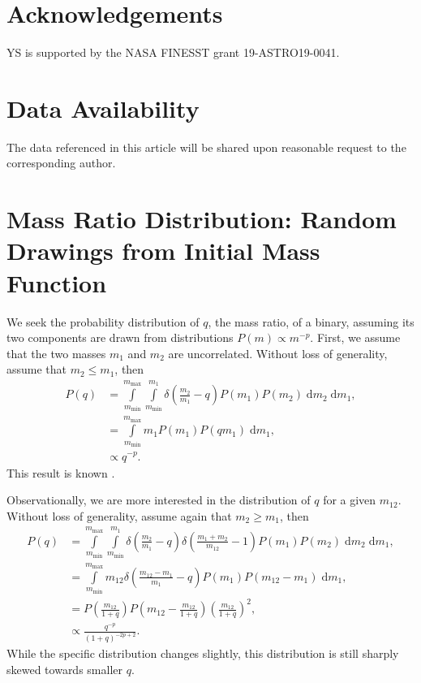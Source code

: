 \documentclass[
        fleqn,
        usenatbib,
    ]{mnras}
\newcommand*{\p}[1]{\left(#1\right)}
\begin{document}
\section{Acknowledgements}\label{s:ack}

YS is supported by the NASA FINESST grant 19-ASTRO19-0041.%

\section{Data Availability}

The data referenced in this article will be shared upon reasonable request to
the corresponding author.




\clearpage
\onecolumn

\appendix

\section{Mass Ratio Distribution: Random Drawings from Initial Mass
Function}\label{s:ratios}

We seek the probability distribution of $q$, the mass ratio, of a binary,
assuming its two components are drawn from distributions $P(m) \propto m^{-p}$.
First, we assume that the two masses $m_1$ and $m_2$ are uncorrelated. Without
loss of generality, assume that $m_2 \leq m_1$, then
\begin{align}
    P(q) &= \int\limits_{m_{\min}}^{m_{\max}}\int\limits_{m_{\min}}^{m_1}
            \delta\p{\frac{m_2}{m_1} - q}P(m_1) P(m_2)
            \;\mathrm{d}m_2\;\mathrm{d}m_1,\\
        &= \int\limits_{m_{\min}}^{m_{\max}} m_1 P(m_1) P(qm_1)
            \;\mathrm{d}m_1,\\
        &\propto q^{-p}.
\end{align}
This result is known \citep[e.g.][]{moe2017mind}.

Observationally, we are more interested in the distribution of $q$ for a given
$m_{12}$. Without loss of generality, assume again that $m_2 \geq m_1$, then
\begin{align}
    P(q) &= \int\limits_{m_{\min}}^{m_{\max}}
            \int\limits_{m_{\min}}^{m_1}
            \delta\p{\frac{m_2}{m_1} - q}
            \delta\p{\frac{m_1 + m_2}{m_{12}} - 1}
            P(m_1)
            P\p{m_2}\;\mathrm{d}m_2\;\mathrm{d}m_1,\\
        &= \int\limits_{m_{\min}}^{m_{\max}}
            m_{12}\delta\p{\frac{m_{12} - m_1}{m_1} - q}
            P(m_1)
            P\p{m_{12} - m_1}\;\mathrm{d}m_1,\\
        &= P\p{\frac{m_{12}}{1 + q}}P\p{m_{12} - \frac{m_{12}}{1 + q}}
            \p{\frac{m_{12}}{1 + q}}^2,\\
        &\propto \frac{q^{-p}}{\p{1 + q}^{-2p + 2}}.
\end{align}
While the specific distribution changes slightly, this distribution is still
sharply skewed towards smaller $q$.
\end{document}
